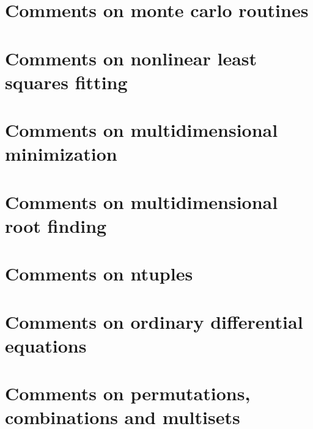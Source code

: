 \documentclass[twoside]{book}
\begin{document}
\chapter{Comments on monte carlo routines}
\label{Comments_01on_01monte_01carlo_01routines}
\hypertarget{Comments_01on_01monte_01carlo_01routines}{}

\chapter{Comments on nonlinear least squares fitting}
\label{Comments_01on_01nonlinear_01least_01squares_01fitting}
\hypertarget{Comments_01on_01nonlinear_01least_01squares_01fitting}{}

\chapter{Comments on multidimensional minimization}
\label{Comments_01on_01multidimensional_01minimization}
\hypertarget{Comments_01on_01multidimensional_01minimization}{}

\chapter{Comments on multidimensional root finding}
\label{Comments_01on_01multidimensional_01root_01finding}
\hypertarget{Comments_01on_01multidimensional_01root_01finding}{}

\chapter{Comments on ntuples}
\label{Comments_01on_01ntuples}
\hypertarget{Comments_01on_01ntuples}{}

\chapter{Comments on ordinary differential equations}
\label{Comments_01on_01ordinary_01differential_01equations}
\hypertarget{Comments_01on_01ordinary_01differential_01equations}{}

\chapter{Comments on permutations, combinations and multisets}
\label{Comments_01on_01permutations_00_01combinations_01and_01multisets}
\hypertarget{Comments_01on_01permutations_00_01combinations_01and_01multisets}{}

\end{document}
